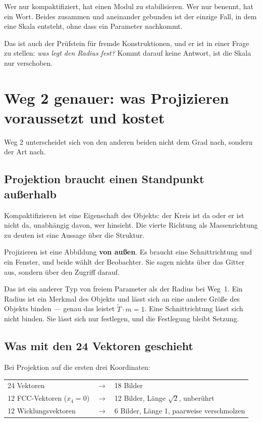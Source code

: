 Wer nur kompaktifiziert, hat einen Modul zu stabilisieren. Wer nur
benennt, hat ein Wort. Beides zusammen und aneinander gebunden ist der
einzige Fall, in dem eine Skala entsteht, ohne dass ein Parameter
nachkommt.

Das ist auch der Prüfstein für fremde Konstruktionen, und er ist in
einer Frage zu stellen: \emph{was legt den Radius fest?} Kommt darauf
keine Antwort, ist die Skala nur verschoben.

\chapter{Weg 2 genauer: was Projizieren voraussetzt und kostet}

Weg 2 unterscheidet sich von den anderen beiden nicht dem Grad nach,
sondern der Art nach.

\section{Projektion braucht einen Standpunkt außerhalb}

Kompaktifizieren ist eine Eigenschaft des Objekts: der Kreis ist da
oder er ist nicht da, unabhängig davon, wer hinsieht. Die vierte
Richtung als Massenrichtung zu deuten ist eine Aussage über die
Struktur.

Projizieren ist eine Abbildung \textbf{von außen}. Es braucht eine
Schnittrichtung und ein Fenster, und beide wählt der Beobachter. Sie
sagen nichts über das Gitter aus, sondern über den Zugriff darauf.

Das ist ein anderer Typ von freiem Parameter als der Radius bei Weg~1.
Ein Radius ist ein Merkmal des Objekts und lässt sich an eine andere
Größe des Objekts binden --- genau das leistet
$\tilde T \cdot m = 1$. Eine Schnittrichtung lässt sich nicht binden.
Sie lässt sich nur festlegen, und die Festlegung bleibt Setzung.

\section{Was mit den 24 Vektoren geschieht}

Bei Projektion auf die ersten drei Koordinaten:
\begin{center}
\begin{tabular}{lcl}
24 Vektoren & $\longrightarrow$ & 18 Bilder \\[4pt]
12 FCC-Vektoren ($x_4 = 0$) & $\longrightarrow$
  & 12 Bilder, Länge $\sqrt2$, unberührt \\
12 Wicklungsvektoren & $\longrightarrow$
  & \phantom{1}6 Bilder, Länge 1, paarweise verschmolzen \\
\end{tabular}
\end{center}

